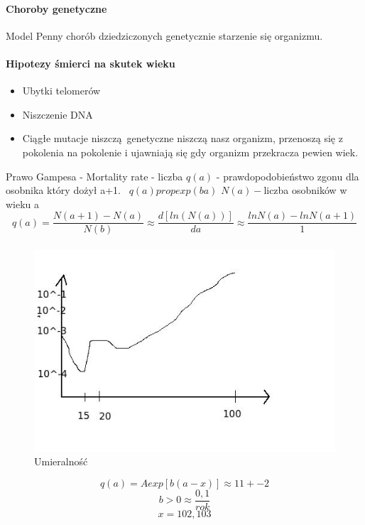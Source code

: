 \documentclass{article}
\begin{document}
		\paragraph{Choroby genetyczne} Model Penny chorób dziedziczonych genetycznie starzenie się organizmu.
		\paragraph{Hipotezy śmierci na skutek wieku}
		\begin{itemize}
			\item Ubytki telomerów
			\item Niszczenie DNA
			\item Ciągłe mutacje niszczą genetyczne niszczą nasz organizm, przenoszą się z pokolenia na pokolenie i ujawniają się gdy organizm przekracza pewien wiek.
		\end{itemize}
		Prawo Gampesa - Mortality rate - liczba $q(a)$ - prawdopodobieństwo zgonu dla osobnika który dożył a+1. \
		$q(a) prop exp(ba)$ 
		$N(a) -$liczba osobników w wieku a
		$$q(a)=\frac{N(a+1)-N(a)}{N(b)} \approx \frac{d[ln(N(a))]}{da}
		\approx \frac{lnN(a)-lnN(a+1)}{1}$$
		
		\paragraph{}
			\begin{figure}[ht]
				\label{fig:fig2}
				\centering
				\includegraphics[scale=0.5]{umieralnosc.jpeg}
				\caption{Umieralność}
			\end{figure}
		 
		 $$q(a)=Aexp[b(a-x)]\approx11+-2$$
		 $$b>0\approx\frac{0,1}{rok}$$
		$$x =102,103$$
		
\end{document}
